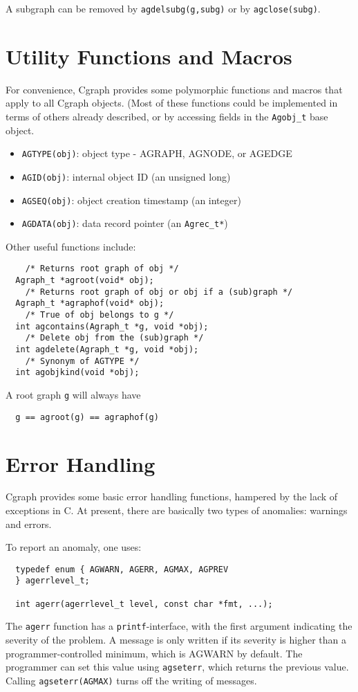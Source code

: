 \documentclass[11pt,letterpaper]{article}
\begin{document}
A subgraph can be removed by \verb"agdelsubg(g,subg)" or by
\verb"agclose(subg)".

\section{Utility Functions and Macros}
\label{sec:utilityfunctionsandmacros}

For convenience, Cgraph provides some polymorphic functions and macros
that apply to all Cgraph objects.   (Most of these functions could
be implemented in terms of others already described, or by accessing
fields in the \verb"Agobj_t" base object.

\begin{itemize}
\item \verb"AGTYPE(obj)":  object type - AGRAPH, AGNODE, or AGEDGE
\item \verb"AGID(obj)": internal object ID (an unsigned long)
\item \verb"AGSEQ(obj)": object creation timestamp (an integer)
\item \verb"AGDATA(obj)": data record pointer (an \verb"Agrec_t*")
\end{itemize}

Other useful functions include:
\begin{verbatim}
    /* Returns root graph of obj */
  Agraph_t *agroot(void* obj);        
    /* Returns root graph of obj or obj if a (sub)graph */
  Agraph_t *agraphof(void* obj);      
    /* True of obj belongs to g */
  int agcontains(Agraph_t *g, void *obj);  
    /* Delete obj from the (sub)graph */
  int agdelete(Agraph_t *g, void *obj);    
    /* Synonym of AGTYPE */
  int agobjkind(void *obj);           
\end{verbatim}
A root graph \verb"g" will always have
\begin{verbatim}
  g == agroot(g) == agraphof(g)
\end{verbatim}

\section{Error Handling}
\label{sec:errorhandling}

Cgraph provides some basic error handling functions, hampered by the
lack of exceptions in C. At present, there are basically two types of anomalies: 
warnings and errors. 

To report an anomaly, one uses:
\begin{verbatim}
  typedef enum { AGWARN, AGERR, AGMAX, AGPREV 
  } agerrlevel_t;

  int agerr(agerrlevel_t level, const char *fmt, ...);
\end{verbatim}
The \verb"agerr" function has a \verb"printf"-interface, with the first argument
indicating the severity of the problem.
A message is only written if its severity is higher than a programmer-controlled minimum, 
which is AGWARN by default. The programmer can set this value using \verb"agseterr", 
which returns the previous value. Calling \verb"agseterr(AGMAX)" turns off the writing of messages.
\end{document}
